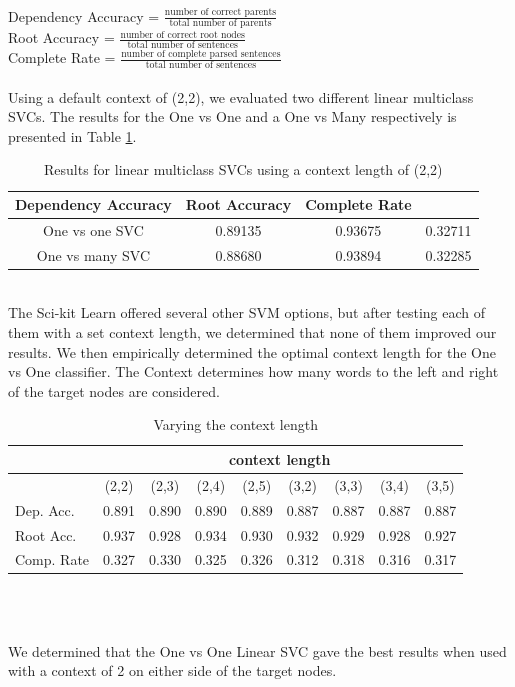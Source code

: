 \documentclass[12pt]{amsart}
\begin{document}
\noindent \\
Dependency Accuracy = $\frac{\text{number of correct parents}}{\text{total number of parents}}$\\
Root Accuracy = $\frac{\text{number of correct root nodes}}{\text{total number of sentences}}$\\
Complete Rate  = $\frac{\text{number of complete parsed sentences}}{\text{total number of sentences}}$\\

\noindent \\
Using a default context of (2,2), we evaluated two different linear multiclass SVCs. The results for the One vs One and a One vs Many respectively is presented in Table \ref{key_results}.
\begin{table}
\label{key_results}
\caption{Results for linear multiclass SVCs using a context length of (2,2)}
        \begin{tabular}{c|ccc}
            \hline \hline Dependency Accuracy & Root Accuracy & Complete Rate \\ \hline
            One vs one SVC & 0.89135 & 0.93675 & 0.32711 \\
            One vs many SVC & 0.88680 & 0.93894 & 0.32285 \\ \hline
        \end{tabular}
\end{table}
\noindent \\
The Sci-kit Learn offered several other SVM options, but after testing each of them with a set context length, we determined
that none of them improved our results. We then empirically determined the optimal context length for the One vs One classifier. The Context determines how many words to the left and right of the target nodes are considered. \\
\begin{table}
\caption{Varying the context length}
\begin{tabular}{l|cccc|cccc}
  \hline \hline
&\multicolumn{8}{c}{context length} \\ \hline
             & (2,2) & (2,3) & (2,4) & (2,5) & (3,2) & (3,3) & (3,4) & (3,5) \\ \hline 
            Dep. Acc. & 0.891 & 0.890 & 0.890 & 0.889 & 0.887 & 0.887 & 0.887 & 0.887 \\
            Root Acc. & 0.937 & 0.928 & 0.934 & 0.930 & 0.932 & 0.929 & 0.928 & 0.927 \\
            Comp. Rate & 0.327 & 0.330 & 0.325 & 0.326 & 0.312 & 0.318 & 0.316 & 0.317 \\ \hline
\end{tabular}\\
\end{table}
\noindent \\
We determined that the One vs One Linear SVC gave the best results when used with a context of 2 on either side of the target nodes. 
\end{document}
